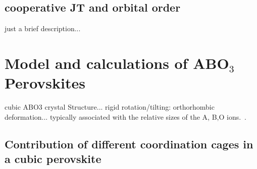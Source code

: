\documentclass[a4paper,prb]{revtex4-1}  %
\newcommand{\com}[1]{}
\begin{document}
\com{
\begin{align}
E_{xy} =&
\frac{32}{7} \left[
\left(1-\frac{1}{(\delta +1)^3}\right) D_2
-
\left(1-\frac{1}{(\delta +1)^5}\right) \frac{20}{9}D_4
\right]\frac{q_o}{a},\\
E_{yz} =& E_{zx} = -3/2 E_{xy},
\end{align}
as measured from their average 
$E_0^{t_{2g}} = -64q_oD_4 \left(2+(\delta +1)^{-5}\right)/9a$.
Similarly, $e_g$ splits up as
\begin{align}
E_{x^2-y^2}=&\frac{32}{7} \left[\left(1-\frac{1}{(\delta +1)^3}\right) \text{D2}+\frac{5}{3}\left(1-\frac{1}{(\delta +1)^5}\right) \text{D4}\right]\frac{q_o}{a},\\
E_{z^2}=&-E_{x^2-y^2},
\end{align}
measured from their average 
$E_0^{e_{g}} = 32 q_oD_4 \left(2+(\delta +1)^{-5}\right)/3a$.
The crystal field splitting becomes
\begin{align}
\Delta \equiv E_0^{e_{g}}-E_0^{t_{2g}}=\frac{160}{9} \left(\frac{1}{(\delta +1)^5}+2\right) D_4.
\end{align}
}




\subsection{cooperative JT and orbital order}
just a brief description... 


\section{Model and calculations of ABO$_3$ Perovskites}%

cubic ABO3 crystal Structure... 
rigid rotation/tilting: orthorhombic deformation... 
typically associated with the relative sizes of the A, B,O ions.~\cite{goodenoughPRL05}.


\subsection{Contribution of different coordination cages in a cubic perovskite}
\label{sec:relativeVoctABO}
\end{document}
